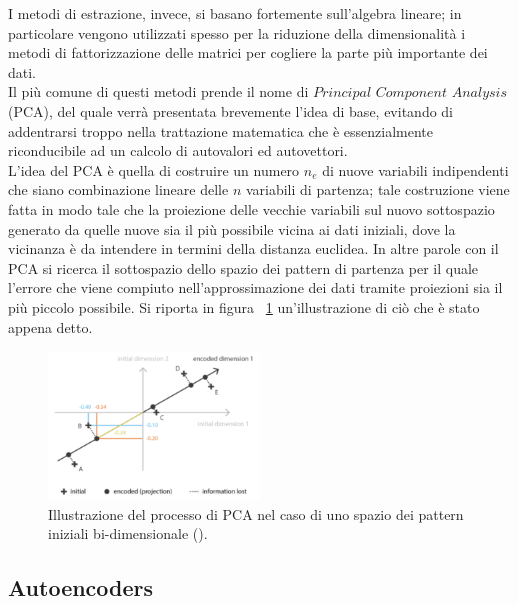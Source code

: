 I metodi di estrazione, invece, si basano fortemente sull'algebra lineare; in particolare vengono utilizzati spesso per la riduzione della dimensionalità i metodi di fattorizzazione delle matrici per cogliere la parte più importante dei dati. \\
Il più comune di questi metodi prende il nome di $\textit{Principal Component Analysis}$ (PCA), del quale verrà presentata brevemente l'idea di base, evitando di addentrarsi troppo nella trattazione matematica che è essenzialmente riconducibile ad un calcolo di autovalori ed autovettori. \\
L'idea del PCA è quella di costruire un numero $\textit{n}_\textit{e}$ di nuove variabili indipendenti che siano combinazione lineare delle $\textit{n}$ variabili di partenza; tale costruzione viene fatta in modo tale che la proiezione delle vecchie variabili sul nuovo sottospazio generato da quelle nuove sia il più possibile vicina ai dati iniziali, dove la vicinanza è da intendere in termini della distanza euclidea. In altre parole con il PCA si ricerca il sottospazio dello spazio dei pattern di partenza per il quale l'errore che viene compiuto nell'approssimazione dei dati tramite proiezioni sia il più piccolo possibile. Si riporta in figura ~\ref{PCA} un'illustrazione di ciò che è stato appena detto.
\\
\begin{figure}[h!]
	\centering
	\includegraphics[width=0.50\textwidth]{figs/PCA.png}
	\caption{Illustrazione del processo di PCA nel caso di uno spazio dei pattern iniziali bi-dimensionale (\cite{Understanding_VAEs}).}
	\label{PCA}
\end{figure}

\newpage

\subsection{Autoencoders}


